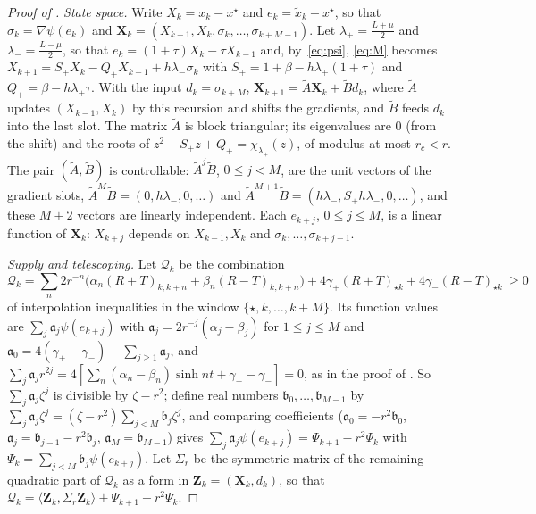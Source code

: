 \documentclass[11pt]{article}
\theoremstyle{definition}
\theoremstyle{remark}
\newcommand{\sh}{\sinh}
\newcommand{\ip}[2]{\langle #1,#2\rangle}
\begin{document}
\begin{proof}[Proof of ]
\emph{State space.}  Write \(X_k=x_k-x^\star\) and \(e_k=\tilde x_k-x^\star\), so that \(\sigma_k=\nabla\psi(e_k)\) and
\(\mathbf X_k=(X_{k-1},X_k,\sigma_k,\dots,\sigma_{k+M-1})\).  Let \(\lambda_+=\frac{L+\mu}2\) and \(\lambda_-=\frac{L-\mu}2\), so that
\(e_k=(1+\tau)X_k-\tau X_{k-1}\) and, by~\eqref{eq:psi}, \eqref{eq:M} becomes
\(X_{k+1}=S_+X_k-Q_+X_{k-1}+h\lambda_-\sigma_k\) with \(S_+=1+\beta-h\lambda_+(1+\tau)\) and
\(Q_+=\beta-h\lambda_+\tau\).  With the input \(d_k=\sigma_{k+M}\),
\(\mathbf X_{k+1}=\tilde A\mathbf X_k+\tilde Bd_k\), where \(\tilde A\) updates \((X_{k-1},X_k)\) by this recursion
and shifts the gradients, and \(\tilde B\) feeds \(d_k\) into the last slot.  The
matrix \(\tilde A\) is block triangular; its eigenvalues are \(0\) (from the shift) and
the roots of \(z^2-S_+z+Q_+=\chi_{\lambda_+}(z)\), of modulus at most \(r_c<r\).  The
pair \((\tilde A,\tilde B)\) is controllable: \(\tilde A^j\tilde B\), \(0\le j<M\), are the unit vectors
of the gradient slots, \(\tilde A^M\tilde B=(0,h\lambda_-,0,\dots)\) and
\(\tilde A^{M+1}\tilde B=(h\lambda_-,S_+h\lambda_-,0,\dots)\), and these \(M+2\) vectors are linearly
independent.  Each \(e_{k+j}\), \(0\le j\le M\), is a linear function of \(\mathbf X_k\): \(X_{k+j}\)
depends on \(X_{k-1},X_k\) and \(\sigma_k,\dots,\sigma_{k+j-1}\).

\emph{Supply and telescoping.}  Let \(\mathcal Q_k\) be the combination
\[
\mathcal Q_k=\sum_n2r^{-n}\bigl(\alpha_n(R+T)_{k,k+n}+\beta_n(R-T)_{k,k+n}\bigr)+4\gamma_+(R+T)_{\star k}+4\gamma_-(R-T)_{\star k}\ \ge0
\]
of interpolation inequalities in the window \(\{\star,k,\dots,k+M\}\).  Its function values
are \(\sum_j\mathfrak a_j\psi(e_{k+j})\) with \(\mathfrak a_j=2r^{-j}(\alpha_j-\beta_j)\) for \(1\le j\le M\) and
\(\mathfrak a_0=4(\gamma_+-\gamma_-)-\sum_{j\ge1}\mathfrak a_j\), and
\(\sum_j\mathfrak a_jr^{2j}=4[\sum_n(\alpha_n-\beta_n)\sh nt+\gamma_+-\gamma_-]=0\), as in the proof of
.  So \(\sum_j\mathfrak a_j\zeta^j\) is divisible by \(\zeta-r^2\); define real numbers \(\mathfrak b_0,\dots,\mathfrak b_{M-1}\) by
\(\sum_j\mathfrak a_j\zeta^j=(\zeta-r^2)\sum_{j<M}\mathfrak b_j\zeta^j\), and comparing coefficients
(\(\mathfrak a_0=-r^2\mathfrak b_0\), \(\mathfrak a_j=\mathfrak b_{j-1}-r^2\mathfrak b_j\), \(\mathfrak a_M=\mathfrak b_{M-1}\)) gives
\(\sum_j\mathfrak a_j\psi(e_{k+j})=\Psi_{k+1}-r^2\Psi_k\) with \(\Psi_k=\sum_{j<M}\mathfrak b_j\psi(e_{k+j})\).  Let \(\Sigma_r\) be
the symmetric matrix of the remaining quadratic part of \(\mathcal Q_k\) as a form in
\(\mathbf Z_k=(\mathbf X_k,d_k)\), so that \(\mathcal Q_k=\ip{\mathbf Z_k}{\Sigma_r\mathbf Z_k}+\Psi_{k+1}-r^2\Psi_k\).


\end{proof}
\end{document}
